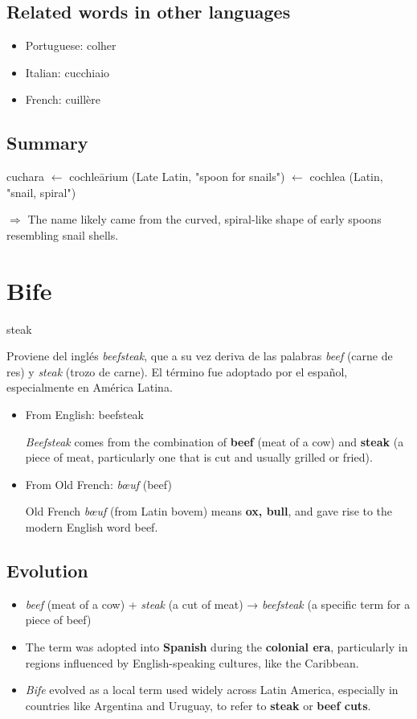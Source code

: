 \documentclass[10pt]{book}
\newcommand{\wordentry}[2]{
	\large #1
	\vspace{-0.5em}
	\begin{etymologybox}
		#2
	\end{etymologybox}
}
\let\oldsection\section
\renewcommand{\section}[1]{
	\needspace{8\baselineskip}
	\oldsection{#1}
}
\begin{document}
	\subsection*{Related words in other languages}
	
	\begin{itemize}
		\item Portuguese: colher
		
		\item Italian: cucchiaio
		
		\item French: cuillère
	\end{itemize}
	
	\subsection*{Summary}
	
	cuchara $\leftarrow$ cochleārium (Late Latin, "spoon for snails") $\leftarrow$ cochlea (Latin, "snail, spiral")
	
	$\Rightarrow$ The name likely came from the curved, spiral-like shape of early spoons resembling snail shells.
	
	\section{Bife}
	\wordentry{steak}{
		Proviene del inglés \textit{beefsteak}, que a su vez deriva de las palabras \textit{beef} (carne de res) y \textit{steak} (trozo de carne). El término fue adoptado por el español, especialmente en América Latina.
		
		\begin{itemize}
			\item From English: beefsteak
			
			\textit{Beefsteak} comes from the combination of \textbf{beef} (meat of a cow) and \textbf{steak} (a piece of meat, particularly one that is cut and usually grilled or fried).
			
			\item From Old French: \textit{bœuf} (beef)
			
			Old French \textit{bœuf} (from Latin bovem) means \textbf{ox, bull}, and gave rise to the modern English word beef.
		\end{itemize}
	}
	
	\subsection*{Evolution}
	\begin{itemize}
		\item \textit{beef} (meat of a cow) + \textit{steak} (a cut of meat) → \textit{beefsteak} (a specific term for a piece of beef)
		\item The term was adopted into \textbf{Spanish} during the \textbf{colonial era}, particularly in regions influenced by English-speaking cultures, like the Caribbean.
		\item \textit{Bife} evolved as a local term used widely across Latin America, especially in countries like Argentina and Uruguay, to refer to \textbf{steak} or \textbf{beef cuts}.
	\end{itemize}
	
\end{document}
